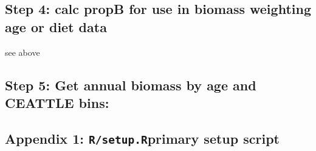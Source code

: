\documentclass[
]{article}
\newenvironment{Shaded}{\begin{snugshade}}{\end{snugshade}}
\newcommand{\AttributeTok}[1]{\textcolor[rgb]{0.77,0.63,0.00}{#1}}
\newcommand{\FunctionTok}[1]{\textcolor[rgb]{0.00,0.00,0.00}{#1}}
\newcommand{\NormalTok}[1]{#1}
\newcommand{\OtherTok}[1]{\textcolor[rgb]{0.56,0.35,0.01}{#1}}
\newcommand{\SpecialCharTok}[1]{\textcolor[rgb]{0.00,0.00,0.00}{#1}}
\newcommand{\StringTok}[1]{\textcolor[rgb]{0.31,0.60,0.02}{#1}}
\begin{document}
\begin{Shaded}
\end{Shaded}

\hypertarget{step-4-calc-propb-for-use-in-biomass-weighting-age-or-diet-data}{%
\subsection{Step 4: calc propB for use in biomass weighting age or diet
data}\label{step-4-calc-propb-for-use-in-biomass-weighting-age-or-diet-data}}

see above

\hypertarget{step-5-get-annual-biomass-by-age-and-ceattle-bins}{%
\subsection{Step 5: Get annual biomass by age and CEATTLE
bins:}\label{step-5-get-annual-biomass-by-age-and-ceattle-bins}}

\hypertarget{appendix-1-rsetup.rprimary-setup-script}{%
\subsection{\texorpdfstring{Appendix 1: \texttt{R/setup.R}primary setup
script}{Appendix 1: R/setup.Rprimary setup script}}\label{appendix-1-rsetup.rprimary-setup-script}}
\end{document}
